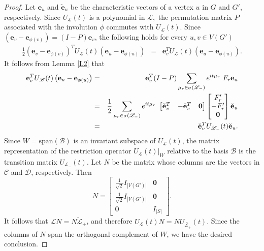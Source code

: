 \documentclass[12pt,a4paper]{article}
\def \e {{\mathbf e}}
\def \o {{\bf 0}}
\newcommand{\ob}[1]{\left(#1\right)}
\begin{document}
\begin{proof}
Let $\e_u$ and $\check{\e}_u$ be the characteristic vectors of a vertex $u$ in $G$ and $G',$ respectively. Since $U_\mathscr{L}(t)$ is a polynomial in $\mathscr{L},$ the permutation matrix $P$ associated with the involution $\phi$ commutes with $U_\mathscr{L}(t).$ Since $\ob{\e_v-\e_{\phi(v)}}=\ob{I-P}\e_v$, the following holds for every $u,v\in V\ob{G'}$
\begin{eqnarray*}
 \frac{1}{2}\ob{\e_v-\e_{\phi(v)}}^T U_\mathscr{L}(t)\ob{\e_u-\e_{\phi(u)}} 
 &=& \e_v^TU_\mathscr{L}(t)\ob{\e_u-\e_{\phi(u)}}.
\end{eqnarray*}
It follows from Lemma \ref{L2} that
\begin{eqnarray*}
  \e_v^TU_\mathscr{L}(t)\ob{\e_u-\e_{\phi(u)}} &=& \e_v^T(I-P)\sum_{\mu_r \in \sigma(\mathscr{L}_-)}e^{it\mu_r}~F_r\e_u\\
  &=& \frac{1}{2}\sum_{\mu_r \in \sigma(\mathscr{L}_-)}e^{it\mu_r}~ \begin{bmatrix}
      \check{\e}_v^T& -\check{\e}_v^T& \o
  \end{bmatrix} \begin{bmatrix}
   F_r'\\
   -F_r'\\
   \o
  \end{bmatrix}\check{\e}_u\\
  &=& \check{\e}_v^T U_{\mathscr{L}_-}(t) \check{\e}_u.
\end{eqnarray*}
Since $W = \text{span}(\mathcal{B})$ is an invariant subspace of $U_{\mathscr{L}}(t)$, the matrix representation of the restriction operator $U_{\mathscr{L}}(t)|_W$ relative to the basis $\mathcal{B}$ is the transition matrix $U_{\mathscr{L}_-}(t)$. Let $N$ be the matrix whose columns are the vectors in $\mathcal{C}$ and $\mathcal{D}$, respectively. Then
\[
N = \begin{bmatrix}
\frac{1}{\sqrt{2}} I_{|V(G')|} & \mathbf{0} \\
\frac{1}{\sqrt{2}} I_{|V(G')|} & \mathbf{0} \\
\mathbf{0} & I_{|S|}
\end{bmatrix}.
\]
It follows that $\mathscr{L}N=N\widetilde{\mathscr{L}}_+$, and therefore $U_\mathscr{L}(t)N=NU_{\widetilde{\mathscr{L}_+}}(t).$ Since the columns of $N$ span the orthogonal complement of $W$, we have the desired conclusion.
\end{proof}
\end{document}
